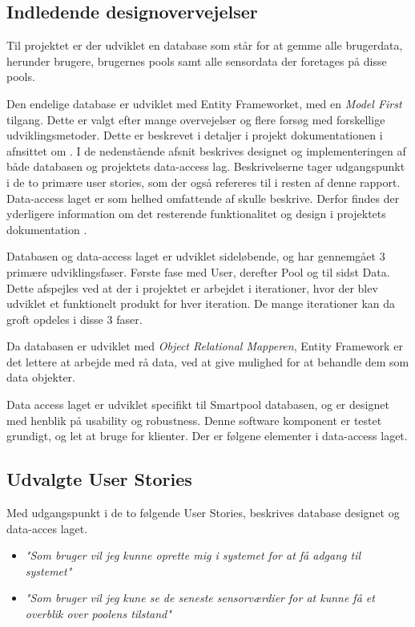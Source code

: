 \subsection{Indledende designovervejelser}\label{sec:designdatabase}

Til projektet er der udviklet en database som står for at gemme alle brugerdata, herunder brugere, brugernes pools samt alle sensordata der foretages på disse pools.

Den endelige database er udviklet med Entity Frameworket, med en \textit{Model First} tilgang. Dette er valgt efter mange overvejelser og flere forsøg med forskellige udviklingsmetoder. Dette er beskrevet i detaljer i projekt dokumentationen i afnsittet om . I de nedenstående afsnit beskrives designet og implementeringen af både databasen og projektets data-access lag. Beskrivelserne tager udgangspunkt i de to primære user stories, som der også refereres til i resten af denne rapport. Data-access laget er som helhed omfattende af skulle beskrive. Derfor findes der yderligere information om det resterende funktionalitet og design i projektets dokumentation .

Databasen og data-access laget er udviklet sideløbende, og har gennemgået 3 primære udviklingsfaser. Første fase med User, derefter Pool og til sidst Data. Dette afspejles ved at der i projektet er arbejdet i iterationer, hvor der blev udviklet et funktionelt produkt for hver iteration. De mange iterationer kan da groft opdeles i disse 3 faser.

Da databasen er udviklet med \textit{Object Relational Mapperen}, Entity Framework er det lettere at arbejde med rå data, ved at give mulighed for at behandle dem som data objekter.

Data access laget er udviklet specifikt til Smartpool databasen, og er designet med henblik på usability og robustness. Denne software komponent er testet grundigt, og let at bruge for klienter.
Der er følgene elementer i data-access laget. 

\subsection{Udvalgte User Stories}
Med udgangspunkt i de to følgende User Stories, beskrives database designet og data-acces laget. 

\begin{itemize}
	\item \textit{"Som bruger vil jeg kunne oprette mig i systemet for at få adgang til systemet"}
	\item \textit{"Som bruger vil jeg kune se de seneste sensorværdier for at kunne få et overblik over poolens tilstand"}
\end{itemize}

